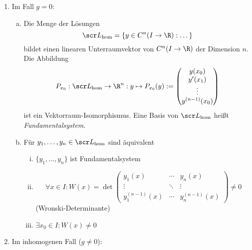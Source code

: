 \begin{kor}[Folgerung] \label{4.6}
	\begin{enumerate}[1)]
		\item
			Im Fall $g = 0$:
			\begin{enumerate}[a)]
				\item
					Die Menge der Lösungen
					\[
						\scr L_{\text{hom}} = \{y \in C^n(I \to \R) : \dotso \}
					\]
					bildet einen linearen Unterraumvektor von $C^n(I \to \R)$ der Dimension $n$.
					Die Abbildung
					\[
						P_{x_0} : \scr L_{\text{hom}} \to \R^n : y \mapsto P_{x_0}(y) := \begin{pmatrix}
							y(x_0) \\ y'(x_1) \\ \vdots \\ y^{(n-1)}(x_0)
						\end{pmatrix}
					\]
					ist ein Vektorraum-Isomorphismus.
					Eine Basis von $\scr L_{\text{hom}}$ heißt \emph{Fundamentalsystem}.
				\item
					Für $y_1, \dotsc, y_n \in \scr L_{\text{hom}}$ sind äquivalent
					\begin{enumerate}[(i)]
						\item
							$\{y_1,\dotsc,y_n\}$ ist Fundamentalsystem
						\item
							\[
									\forall x \in I : W(x) = \det \begin{pmatrix}
									y_1(x) & \cdots & y_n(x) \\
									\vdots & \ddots & \vdots \\
									y_1^{(n-1)}(x) & \cdots & y_n^{(n-1)}(x)
								\end{pmatrix} \neq 0
							\]
							(Wronski-Determinante)
						\item
							$\exists x_0 \in I : W(x) \neq 0$
					\end{enumerate}
			\end{enumerate}
		\item
			Im inhomogenen Fall ($g \neq 0$):


\end{enumerate}
\end{kor}
